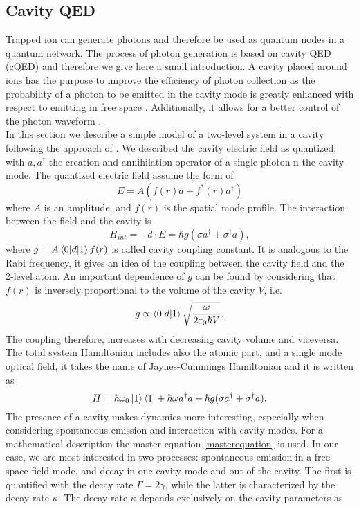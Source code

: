 \subsection{Cavity QED}
Trapped ion can generate photons and therefore be used as quantum nodes in a quantum network. The process of photon generation is based on cavity QED (cQED) and therefore we give here a small introduction. A cavity placed around ions has the purpose to improve the efficiency of photon collection as the probability of a photon to be emitted in the cavity mode is greatly enhanced with respect to emitting in free space \cite{Kimble_1998}. Additionally, it allows for a better control of the photon waveform \cite{Keller2004}.\\
In this section we describe a simple model of a two-level system in a cavity following the approach of \cite{steck}. We described the cavity electric field as quantized, with $a,a^\dagger$ the creation and annihilation operator of a single photon n the cavity mode.
The quantized electric field assume the form of
\begin{equation}
E = A(f(r)a + f^*(r)a^\dagger)
\end{equation}
where $A$ is an amplitude, and $f(r)$ is the spatial mode profile. The interaction between the field and the cavity is
\begin{equation}
H_{int}  = -d\cdot E = \hbar g (\sigma a^\dagger + \sigma^\dagger a),
\end{equation}
where $g = A \braket{0|d|1} f(r)$ is called cavity coupling constant. It is analogous to the Rabi frequency, it gives an idea of the coupling between the cavity field and the 2-level atom. An important dependence of $g$ can be found by considering that $f(r)$ is inversely proportional to the volume of the cavity $V$, i.e.
\begin{equation}
g \propto \braket{0|d|1} \sqrt{\frac{\omega}{2\varepsilon_0 \hbar V}}.
\end{equation}
The coupling therefore, increases with decreasing cavity volume and viceversa.\\
The total system Hamiltonian includes also the atomic part, and a single mode optical field, it takes the name of Jaynes-Cummings Hamiltonian and it is written as \cite{qedreview}
\begin{equation}
H = \hbar \omega_0 \ket{1}\bra{1} + \hbar \omega a^\dagger a + \hbar g (\sigma a^\dagger + \sigma^\dagger a).
\end{equation}
The presence of a cavity makes dynamics more interesting, especially when considering spontaneous emission and interaction with cavity modes. For a mathematical description the master equation \eqref{masterequation} is used. In our case, we are most interested in two processes: spontaneous emission in a free space field mode, and decay in one cavity mode and out of the cavity. The first is quantified with the decay rate $\Gamma = 2\gamma$, while the latter is characterized by the decay rate $\kappa$. The decay rate $\kappa$ depends exclusively on the cavity parameters as \cite{helene}
